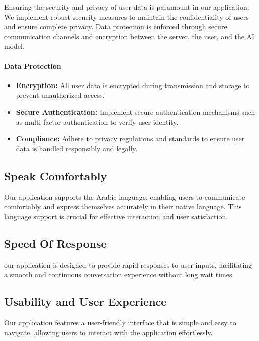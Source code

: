 Ensuring the security and privacy of user data is paramount in our application. We implement robust security measures to maintain the confidentiality of users and ensure complete privacy. Data protection is enforced through secure communication channels and encryption between the server, the user, and the AI model.

\paragraph{Data Protection}

\begin{itemize}
    \item \textbf{Encryption:} All user data is encrypted during transmission and storage to prevent unauthorized access.
    \item \textbf{Secure Authentication:} Implement secure authentication mechanisms such as multi-factor authentication to verify user identity.
    \item \textbf{Compliance:} Adhere to privacy regulations and standards to ensure user data is handled responsibly and legally.
\end{itemize}

\subsection{Speak Comfortably}

Our application supports the Arabic language, enabling users to communicate comfortably and express themselves accurately in their native language. This language support is crucial for effective interaction and user satisfaction.

\subsection{Speed Of Response}

our application is designed to provide rapid responses to user inputs, facilitating a smooth and continuous conversation experience without long wait times.

\subsection{Usability and User Experience}

Our application features a user-friendly interface that is simple and easy to navigate, allowing users to interact with the application effortlessly.

